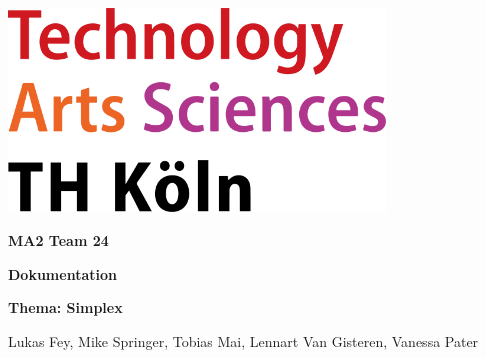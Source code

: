 \pagecolor{white}\afterpage{\nopagecolor}


\includegraphics[width=10cm]{images/TH_Koeln_Logo.svg.png}
\vspace{2in}

\fontsize{50}{50}\selectfont \textcolor{FSBlue}{\textbf{MA2 Team 24}}

\fontsize{30}{30}\selectfont \textcolor{FSBlue}{\textbf{Dokumentation}}

\vspace{10mm}
\LARGE\textcolor{FSBlue}{\textbf{Thema: Simplex}}

\vspace{0.5in}

\Large\textcolor{FSBlue}{Lukas Fey, Mike Springer, Tobias Mai, Lennart Van Gisteren, Vanessa Pater}

\vspace{3in}



\thispagestyle{empty}
\restoregeometry   
\newpage